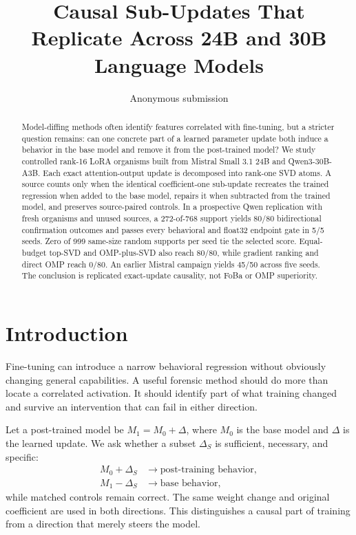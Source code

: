 \documentclass[10pt,twocolumn]{article}
\title{Causal Sub-Updates That Replicate Across 24B and 30B Language Models}
\author{Anonymous submission}
\date{}
\begin{document}
\maketitle

\begin{abstract}
Model-diffing methods often identify features correlated with fine-tuning, but a stricter question remains: can one concrete part of a learned parameter update both induce a behavior in the base model and remove it from the post-trained model? We study controlled rank-16 LoRA organisms built from Mistral Small 3.1 24B and Qwen3-30B-A3B. Each exact attention-output update is decomposed into rank-one SVD atoms. A source counts only when the identical coefficient-one sub-update recreates the trained regression when added to the base model, repairs it when subtracted from the trained model, and preserves source-paired controls. In a prospective Qwen replication with fresh organisms and unused sources, a 272-of-768 support yields 80/80 bidirectional confirmation outcomes and passes every behavioral and float32 endpoint gate in 5/5 seeds. Zero of 999 same-size random supports per seed tie the selected score. Equal-budget top-SVD and OMP-plus-SVD also reach 80/80, while gradient ranking and direct OMP reach 0/80. An earlier Mistral campaign yields 45/50 across five seeds. The conclusion is replicated exact-update causality, not FoBa or OMP superiority.
\end{abstract}

\section{Introduction}

Fine-tuning can introduce a narrow behavioral regression without obviously changing general capabilities. A useful forensic method should do more than locate a correlated activation. It should identify part of what training changed and survive an intervention that can fail in either direction.

Let a post-trained model be $M_1=M_0+\Delta$, where $M_0$ is the base model and $\Delta$ is the learned update. We ask whether a subset $\Delta_S$ is sufficient, necessary, and specific:
\begin{align*}
M_0+\Delta_S &\rightarrow \text{post-training behavior},\\
M_1-\Delta_S &\rightarrow \text{base behavior},
\end{align*}
while matched controls remain correct. The same weight change and original coefficient are used in both directions. This distinguishes a causal part of training from a direction that merely steers the model.
\end{document}
